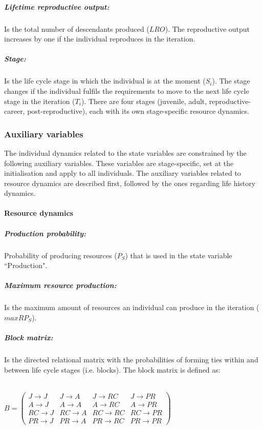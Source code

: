 \documentclass{article}
\begin{document}
\subparagraph{Lifetime reproductive output:}

Is the total number of descendants produced ($LRO$). The reproductive output increases by one if the individual reproduces in the iteration.

\subparagraph{Stage:}

Is the life cycle stage in which the individual is at the moment ($S_i$). The stage changes if the individual fulfils  the requirements to move to the next life cycle stage in the iteration ($T_i$). There are four stages (juvenile, adult, reproductive-career, post-reproductive), each with its own stage-specific resource dynamics.
 
\subsubsection{Auxiliary variables}

The individual dynamics related to the state variables are constrained by the following auxiliary variables. These variables are stage-specific, set at the initialisation and apply to all individuals. The auxiliary variables related to resource dynamics are described first, followed by the ones regarding life history dynamics.

\paragraph{Resource dynamics}

\subparagraph{Production probability:}

Probability of producing resources ($P_S$) that is used in the state variable ``Production".

\subparagraph{Maximum resource production:}

Is the maximum amount of resources an individual can produce in the iteration ($maxRP_S$).

\subparagraph{Block matrix:}

Is the directed relational matrix with the probabilities of forming ties within and between life cycle stages (i.e. blocks). The block matrix is defined as:
\\\\

\begin{center}
$
B=
\begin{pmatrix}
      J \to J & J \to A & J \to RC & J \to PR \\
      A \to J & A \to A & A \to RC & A \to PR \\
      RC \to J & RC \to A & RC \to RC & RC \to PR \\
      PR \to J & PR \to A & PR \to RC & PR \to PR
\end{pmatrix}
$  
\end{center}
\ \\
\ \\ 
\end{document}
